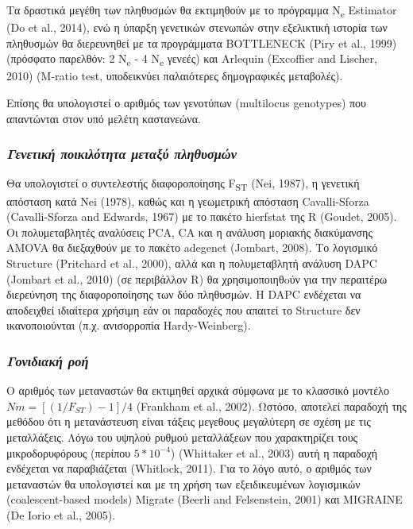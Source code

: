 \documentclass[12pt,a4paper,]{report}
\begin{document}
Τα δραστικά μεγέθη των πληθυσμών θα εκτιμηθούν με το πρόγραμμα
N\textsubscript{e} Estimator (Do et al., 2014), ενώ η ύπαρξη γενετικών
στενωπών στην εξελικτική ιστορία των πληθυσμών θα διερευνηθεί με τα
προγράμματα BOTTLENECK (Piry et al., 1999) (πρόσφατο παρελθόν: 2
N\textsubscript{e} - 4 N\textsubscript{e} γενεές) και Arlequin
(Excoffier and Lischer, 2010) (M-ratio test, υποδεικνύει παλαιότερες
δημογραφικές μεταβολές).

Επίσης θα υπολογιστεί ο αριθμός των γενοτύπων (multilocus genotypes) που
απαντώνται στον υπό μελέτη καστανεώνα.

\hypertarget{---}{%
\subsubsection{\texorpdfstring{\emph{Γενετική ποικιλότητα μεταξύ
πληθυσμών}}{Γενετική ποικιλότητα μεταξύ πληθυσμών}}\label{---}}

Θα υπολογιστεί ο συντελεστής διαφοροποίησης F\textsubscript{ST} (Nei,
1987), η γενετική απόσταση κατά Nei (1978), καθώς και η γεωμετρική
απόσταση Cavalli-Sforza (Cavalli-Sforza and Edwards, 1967) με το πακέτο
hierfstat της R (Goudet, 2005). Οι πολυμεταβλητές αναλύσεις PCA, CA και
η ανάλυση μοριακής διακύμανσης AMOVA θα διεξαχθούν με το πακέτο adegenet
(Jombart, 2008). Το λογισμικό Structure (Pritchard et al., 2000), αλλά
και η πολυμεταβλητή ανάλυση DAPC (Jombart et al., 2010) (σε περιβάλλον
R) θα χρησιμοποιηθoύν για την περαιτέρω διερεύνηση της διαφοροποίησης
των δύο πληθυσμών. H DAPC ενδέχεται να αποδειχθεί ιδιαίτερα χρήσιμη εάν
οι παραδοχές που απαιτεί το Structure δεν ικανοποιούνται (π.χ.
ανισορροπία Hardy-Weinberg).

\hypertarget{-}{%
\subsubsection{\texorpdfstring{\emph{Γονιδιακή
ροή}}{Γονιδιακή ροή}}\label{-}}

Ο αριθμός των μεταναστών θα εκτιμηθεί αρχικά σύμφωνα με το κλασσικό
μοντέλο \(Nm = [(1 / F_{ST}) - 1] / 4\) (Frankham et al., 2002). Ωστόσο,
αποτελεί παραδοχή της μεθόδου ότι η μετανάστευση είναι τάξεις μεγεθους
μεγαλύτερη σε σχέση με τις μεταλλάξεις. Λόγω του υψηλού ρυθμού
μεταλλάξεων που χαρακτηρίζει τους μικροδορυφόρους (περίπου
\(5 * 10^{-4}\)) (Whittaker et al., 2003) αυτή η παραδοχή ενδέχεται να
παραβιάζεται (Whitlock, 2011). Για το λόγο αυτό, ο αριθμός των
μεταναστών θα υπολογιστεί και με τη χρήση των εξειδικευμένων λογισμικών
(coalescent-based models) Migrate (Beerli and Felsenstein, 2001) και
MIGRAINE (De Iorio et al., 2005).
\end{document}
